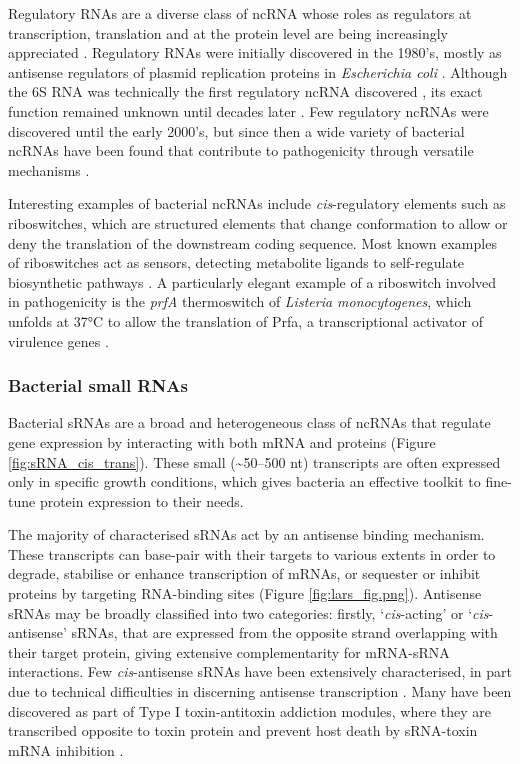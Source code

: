 Regulatory RNAs are a diverse class of ncRNA whose roles as regulators at transcription, translation and at the protein level are being increasingly appreciated \citep{Cech2014-pe}. Regulatory RNAs were initially discovered in the 1980’s, mostly as antisense regulators of plasmid replication proteins in \textit{Escherichia coli} \citep{Conrad1979-xe,Stougaard1981-np,Inouye1988-rv}. Although the 6S RNA was technically the first regulatory ncRNA discovered \citep{Brownlee1971-lh}, its exact function remained unknown until decades later \citep{Barrick2005-if}. Few regulatory ncRNAs were discovered until the early 2000’s, but since then a wide variety of bacterial ncRNAs have been found that contribute to pathogenicity through versatile mechanisms \citep{Papenfort2010-cj}.\par

Interesting examples of bacterial ncRNAs include \textit{cis}-regulatory elements such as riboswitches, which are structured elements that change conformation to allow or deny the translation of the downstream coding sequence. Most known examples of riboswitches act as sensors, detecting metabolite ligands to self-regulate biosynthetic pathways \citep{Serganov2013-fz}. A particularly elegant example of a riboswitch involved in pathogenicity is the \textit{prfA} thermoswitch of \textit{Listeria monocytogenes}, which unfolds at 37°C to allow the translation of Prfa, a transcriptional activator of virulence genes \citep{Johansson2002-ar}.\par

\subsubsection{Bacterial small RNAs}

Bacterial sRNAs are a broad and heterogeneous class of ncRNAs that regulate gene expression by interacting with both mRNA and proteins (Figure \ref{fig:sRNA_cis_trans}). These small (\textasciitilde50--500 nt) transcripts are often expressed only in specific growth conditions, which gives bacteria an effective toolkit to fine-tune protein expression to their needs.\par
The majority of characterised sRNAs act by an antisense binding mechanism. These transcripts can base-pair with their targets to various extents in order to degrade, stabilise or enhance transcription of mRNAs, or sequester or inhibit proteins by targeting RNA-binding sites \citep{Storz2011-tb,Barquist2015-pa} (Figure \ref{fig:lars_fig.png}). Antisense sRNAs may be broadly classified into two categories: firstly, ‘\textit{cis}-acting’ or ‘\textit{cis}-antisense’ sRNAs, that are expressed from the opposite strand overlapping with their target protein, giving extensive complementarity for mRNA-sRNA interactions. Few \textit{cis}-antisense sRNAs have been extensively characterised, in part due to technical difficulties in discerning antisense transcription \citep{Georg2011-ee}. Many have been discovered as part of Type I toxin-antitoxin addiction modules, where they are transcribed opposite to toxin protein and prevent host death by sRNA-toxin mRNA inhibition \citep{Brantl2012-ad}. \par


